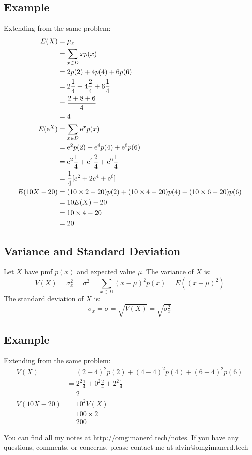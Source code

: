 \documentclass[letterpaper, 12pt]{math}
\begin{document}
\subsection*{Example}
Extending from the same problem:
\begin{align*}
  E(X) &= \mu_{x} \\
  &= \sum_{x\in D}xp(x) \\
  &= 2p(2)+4p(4)+6p(6) \\
  &= 2\frac{1}{4}+4\frac{2}{4}+6\frac{1}{4} \\
  &= \frac{2+8+6}{4} \\
  &= 4 \\
  E(\mathrm{e}^{X}) &= \sum_{x\in D}\mathrm{e}^{x}p(x) \\
  &= \mathrm{e}^{2}p(2)+\mathrm{e}^{4}p(4)+\mathrm{e}^{6}p(6) \\
  &= \mathrm{e}^{2}\frac{1}{4}+\mathrm{e}^{4}\frac{2}{4}+\mathrm{e}^{6}\frac{1}{4} \\
  &= \frac{1}{4}[e^{2}+2e^{4}+\mathrm{e}^{6}] \\
  E(10X-20) &= (10\times2-20)p(2)+(10\times4-20)p(4)+(10\times6-20)p(6) \\
  &= 10E(X)-20 \\
  &= 10\times4-20 \\
  &= 20
\end{align*}

\subsection*{Variance and Standard Deviation}
Let \( X \) have pmf \( p(x) \) and expected value \( \mu \). The variance of
\( X \) is:
\[ V(X) = \sigma_{x}^{2} = \sigma^{2} = \sum_{x\in D}(x-\mu)^{2}p(x) =
   E((x-\mu)^{2}) \]
The standard deviation of \( X \) is:
\[ \sigma_{x} = \sigma = \sqrt{V(X)} = \sqrt{\sigma_{x}^{2}} \]

\subsection*{Example}
Extending from the same problem:
\begin{align*}
  V(X) &= (2-4)^{2}p(2)+(4-4)^{2}p(4)+(6-4)^{2}p(6) \\
  &= 2^{2}\frac{1}{4}+0^{2}\frac{2}{4}+2^{2}\frac{1}{4} \\
  &= 2 \\
  V(10X-20) &= 10^{2}V(X) \\
  &= 100\times2 \\
  &= 200
\end{align*}

\begin{center}
  You can find all my notes at \url{http://omgimanerd.tech/notes}. If you have
  any questions, comments, or concerns, please contact me at
  alvin@omgimanerd.tech
\end{center}
\end{document}
